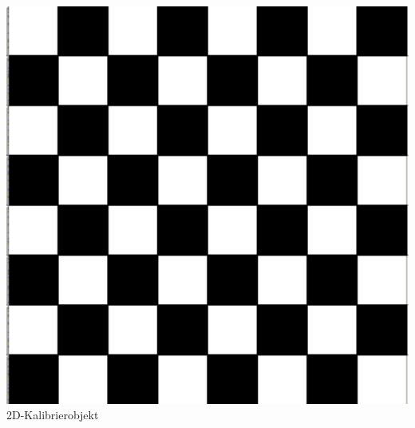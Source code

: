 \documentclass{beamer}
\begin{document}
\begin{frame}
\begin{columns}
\begin{column}{0.45\textwidth}
			\centering
			\includegraphics[width=1\textwidth]{bilder/schachbrett.png}\\
			2D-Kalibrierobjekt
		\end{column}
	\end{columns}
\end{frame}



\end{document}
